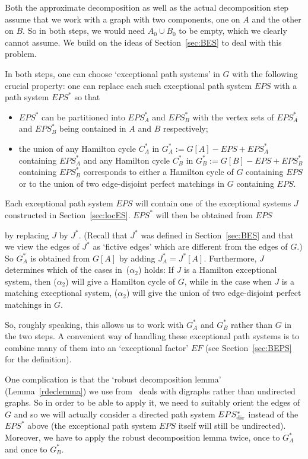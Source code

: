 \documentclass{memo-l}
\def\COMMENT#1{}
\numberwithin{section}{chapter}
\numberwithin{equation}{section}
\numberwithin{firstthm}{section}
\numberwithin{figure}{section}
\begin{document}
Both the approximate decomposition as well as the actual decomposition step assume that we work with a graph with two components,
one on $A$ and the other on $B$. So in both steps, we would need $A_0 \cup B_0$ to be empty, which we clearly cannot assume. 
We build on the ideas of Section~\ref{sec:BES} to deal with this problem.%
\COMMENT{Deryk modified a bit.}
In both steps, one can choose `exceptional path systems' in $G$ with the following crucial property:
one can replace each such exceptional path system $EPS$ with a path system $EPS^*$ so that
\begin{itemize}
\item[($\alpha_1$)] $EPS^*$ can be partitioned into $EPS^*_A$ and $EPS^*_B$ with the vertex sets of $EPS^*_A$ and $EPS^*_B$
being contained in $A$ and $B$ respectively;
\item[($\alpha_2$)] the union of any Hamilton cycle $C^*_A$ in $G^*_A:=G[A]-EPS+ EPS^*_A$ containing $EPS^*_A$ and
any Hamilton cycle $C^*_B$ in $G^*_B :=G[B]-EPS + EPS^*_B$ containing $EPS^*_B$ corresponds to either a Hamilton cycle of $G$ containing $EPS$
or to the union of two edge-disjoint perfect matchings in $G$ containing $EPS$.
\end{itemize}
Each exceptional path system $EPS$ will contain one of the exceptional systems $J$ constructed in Section~\ref{sec:locES}.
$EPS^*$ will then be obtained from $EPS$%
   \COMMENT{Daniela: added from $EPS$}
by replacing $J$ by $J^*$. (Recall that $J^*$ was defined in Section~\ref{sec:BES} and that
we view the edges of $J^*$ as `fictive edges' which are different from the edges of $G$.)
So $G^*_A$ is obtained from $G[A]$ by adding $J^*_A=J^*[A]$.
Furthermore, $J$ determines which of the cases in~($\alpha_2$) holds: If $J$ is a Hamilton exceptional system,
then ($\alpha_2$) will give a Hamilton cycle of $G$, while in the case when $J$ is a matching exceptional system,
($\alpha_2$) will give the union of two edge-disjoint perfect matchings in $G$.

So, roughly speaking, this allows us to work with $G^*_A$ and $G^*_B$ rather than $G$ in the two steps.
A convenient way of handling these exceptional path systems is to combine many of them into an `exceptional factor' $EF$
(see Section~\ref{sec:BEPS} for the definition).

One complication is that the `robust decomposition lemma' (Lemma~\ref{rdeclemma}) we use from~\cite{Kelly}
deals with digraphs rather than undirected graphs. 
So in order to be able to apply it, we need to suitably orient the edges of $G$ and so we will actually consider a
directed path system $EPS^*_{\rm dir}$ instead of the $EPS^*$ above (the exceptional path system $EPS$ itself will
still be undirected). Moreover,  we have to apply the robust
decomposition lemma twice, once to $G^*_A$ and once to $G^*_B$. 
\end{document}
